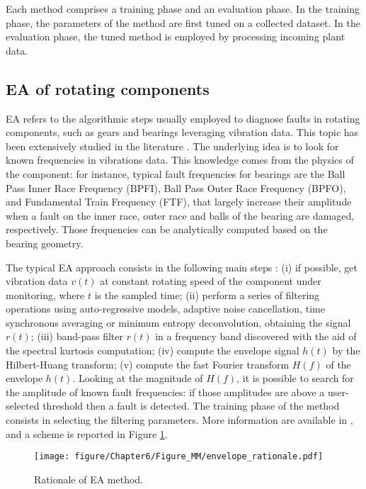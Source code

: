\begin{remark}

Each method comprises a training phase and an evaluation phase. In the training phase, the parameters of the method are first tuned on a collected dataset. In the evaluation phase, the tuned method is employed by processing incoming plant data.
\end{remark}

\lhead{\textbf{\rightmark}}


\subsection{EA of rotating components}\label{subsec:envelope}

 
EA refers to the  algorithmic steps usually employed {to diagnose faults in rotating components, such as gears and bearings leveraging vibration data.} This topic has been extensively studied in the literature \cite{randall2011vibration}. The underlying idea is to look for known frequencies in vibrations data. This knowledge come{s} from the physics of the component: for instance, typical fault frequencies for bearings are the Ball Pass Inner Race Frequency (BPFI), Ball Pass Outer Race Frequency (BPFO), and Fundamental Train Frequency (FTF), that largely increase their amplitude when a fault on the inner race, outer race and balls of the bearing are damaged, respectively. Those frequencies can be analytically computed based on the bearing geometry.
 
The typical EA approach consists in the following main steps \cite{RANDALL2011485}: (i) if possible, get vibration data $v(t)$ at constant rotating speed of the component under monitoring, where $t$ is the sampled time; (ii) perform a series of filtering operations using auto-regressive models, adaptive noise cancellation, time synchronous averaging or minimum entropy deconvolution, obtaining the signal $r(t)$; (iii) band-pass filter $r(t)$ in a frequency band discovered with the aid of the spectral kurtosis computation; (iv) compute the envelope signal $h(t)$ by the Hilbert-Huang transform; (v) compute the fast Fourier transform $H(f)$ of the envelope $h(t)$.
%
Looking at the magnitude of $H(f)$, it is possible to search for the amplitude of known fault frequencies: if those amplitudes are above a user-selected threshold then a fault is detected. 
%
The training phase of the method consists in selecting the filtering parameters.
%
More information are available in \cite{mazzoleni2021EMA}, and a scheme is reported in Figure \ref{fig:ea_rationale}.
\begin{figure}[!ht]
    \centering
    \texttt{[image: figure/Chapter6/Figure\_MM/envelope\_rationale.pdf]}
    \caption{Rationale of EA method.}
    \label{fig:ea_rationale}
\end{figure}


